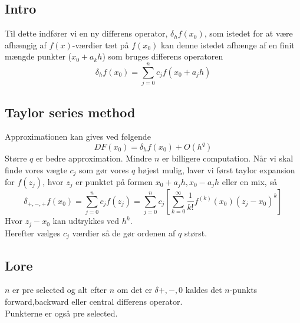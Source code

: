 \documentclass[11pt,a4paper]{article}
\begin{document}
\subsection*{Intro}
Til dette indfører vi en ny differens operator, $\delta_hf(x_0)$, som istedet for at være afhængig af $f(x)$-værdier tæt på $f(x_0)$ kan denne istedet afhænge af en finit mængde punkter ($x_0+a_kh$) som bruges differens operatoren
$$\delta_hf(x_0)=\sum_{j=0}^nc_jf(x_0+a_jh)$$

\subsection*{Taylor series method}
Approximationen kan gives ved følgende 
$$DF(x_0)=\delta_hf(x_0)+O(h^q)$$
Større $q$ er bedre approximation. Mindre $n$ er billigere computation. Når vi skal finde vores vægte $c_j$ som gør vores $q$ højest mulig, laver vi først taylor expansion for $f(z_j)$, hvor $z_j$ er punktet på formen $x_0+a_jh,x_0-a_jh$ eller en mix, så
$$\delta_{+,-,+}f(x_0)=\sum_{j=0}^nc_jf(z_j)=\sum_{j=0}^nc_j[\sum_{k=0}^\infty \frac{1}{k!}f^{(k)}(x_0)(z_j-x_0)^k]$$
Hvor $z_j-x_0$ kan udtrykkes ved $h^k$.\\
Herefter vælges $c_j$ værdier så de gør ordenen af $q$ størst.

\subsection*{Lore}
$n$ er pre selected og alt efter $n$ om det er $\delta{+,-,0}$ kaldes det $n$-punkts forward,backward eller central differens operator.\\
Punkterne er også pre selected.
\end{document}
